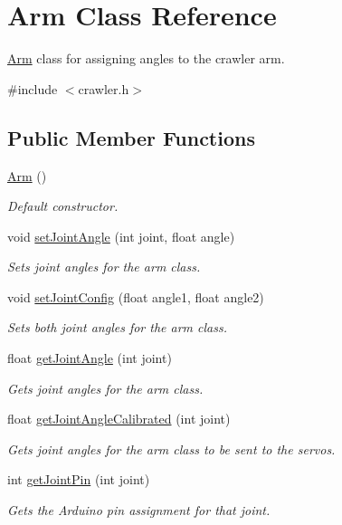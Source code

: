 \hypertarget{classArm}{\section{Arm Class Reference}
\label{classArm}
}


\hyperlink{classArm}{Arm} class for assigning angles to the crawler arm.  




{\ttfamily \#include $<$crawler.\-h$>$}

\subsection*{Public Member Functions}
\begin{DoxyCompactItemize}
\item 
\hyperlink{classArm_a920d0f828c6e76188827cf0c073963de}{Arm} ()
\begin{DoxyCompactList}\small\item\em Default constructor. \end{DoxyCompactList}\item 
void \hyperlink{classArm_a51bf7b1e2395c7437dd307ea689bd63e}{set\-Joint\-Angle} (int joint, float angle)
\begin{DoxyCompactList}\small\item\em Sets joint angles for the arm class. \end{DoxyCompactList}\item 
void \hyperlink{classArm_a3420d04cfe246e50b7d06dfc438184b0}{set\-Joint\-Config} (float angle1, float angle2)
\begin{DoxyCompactList}\small\item\em Sets both joint angles for the arm class. \end{DoxyCompactList}\item 
float \hyperlink{classArm_ac02320e3e99d6ff5c216f991b3540f5d}{get\-Joint\-Angle} (int joint)
\begin{DoxyCompactList}\small\item\em Gets joint angles for the arm class. \end{DoxyCompactList}\item 
float \hyperlink{classArm_a27305db80b3780b83162d63a19693d0b}{get\-Joint\-Angle\-Calibrated} (int joint)
\begin{DoxyCompactList}\small\item\em Gets joint angles for the arm class to be sent to the servos. \end{DoxyCompactList}\item 
int \hyperlink{classArm_a3be1d9132b03b8d8ea120271f699fd5a}{get\-Joint\-Pin} (int joint)
\begin{DoxyCompactList}\small\item\em Gets the Arduino pin assignment for that joint. \end{DoxyCompactList}\end{DoxyCompactItemize}


